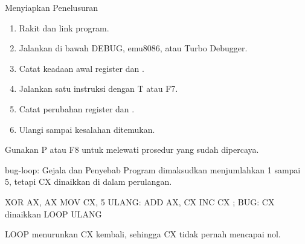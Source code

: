 \documentclass[aspectratio=169,11pt]{beamer}
\begin{document}

\begin{frame}{Menyiapkan Penelusuran}
\small
\begin{enumerate}
    \item Rakit dan link program.

    \vspace{0.15em}
    \item Jalankan di bawah DEBUG, emu8086, atau Turbo Debugger.

    \vspace{0.15em}
    \item Catat keadaan awal register dan .

    \vspace{0.15em}
    \item Jalankan satu instruksi dengan T atau F7.

    \vspace{0.15em}
    \item Catat perubahan register dan .

    \vspace{0.15em}
    \item Ulangi sampai kesalahan ditemukan.
\end{enumerate}

\vspace{0.15em}
{\footnotesize\color{obeGray}Gunakan P atau F8 untuk melewati prosedur
yang sudah dipercaya.\par}
\end{frame}

\begin{frame}[fragile]{bug-loop: Gejala dan Penyebab}
\small
Program dimaksudkan menjumlahkan 1 sampai 5, tetapi CX dinaikkan di
dalam perulangan.

\vspace{0.2em}
\begin{kodeasm}[numbers=none]
XOR AX, AX
MOV CX, 5
ULANG:
    ADD AX, CX
    INC CX          ; BUG: CX dinaikkan
    LOOP ULANG
\end{kodeasm}

\vspace{0.15em}
{\footnotesize\color{obeMaroon}LOOP menurunkan CX kembali, sehingga CX
tidak pernah mencapai nol.\par}
\end{frame}
\end{document}

